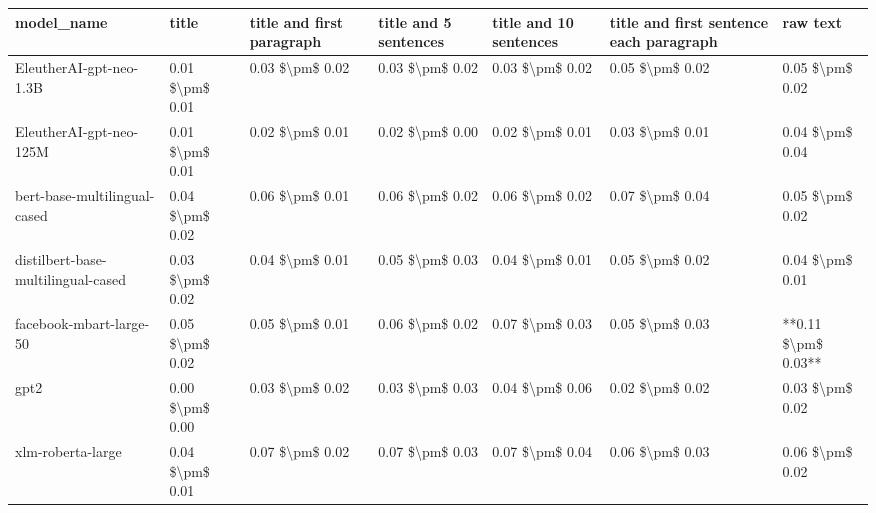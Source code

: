 \begin{tabular}{lllllll}
\toprule
                        model\_name &           title & title and first paragraph & title and 5 sentences & title and 10 sentences & title and first sentence each paragraph &            raw text \\
\midrule
           EleutherAI-gpt-neo-1.3B & 0.01 \$\textbackslash pm\$ 0.01 &           0.03 \$\textbackslash pm\$ 0.02 &       0.03 \$\textbackslash pm\$ 0.02 &        0.03 \$\textbackslash pm\$ 0.02 &                         0.05 \$\textbackslash pm\$ 0.02 &     0.05 \$\textbackslash pm\$ 0.02 \\
           EleutherAI-gpt-neo-125M & 0.01 \$\textbackslash pm\$ 0.01 &           0.02 \$\textbackslash pm\$ 0.01 &       0.02 \$\textbackslash pm\$ 0.00 &        0.02 \$\textbackslash pm\$ 0.01 &                         0.03 \$\textbackslash pm\$ 0.01 &     0.04 \$\textbackslash pm\$ 0.04 \\
      bert-base-multilingual-cased & 0.04 \$\textbackslash pm\$ 0.02 &           0.06 \$\textbackslash pm\$ 0.01 &       0.06 \$\textbackslash pm\$ 0.02 &        0.06 \$\textbackslash pm\$ 0.02 &                         0.07 \$\textbackslash pm\$ 0.04 &     0.05 \$\textbackslash pm\$ 0.02 \\
distilbert-base-multilingual-cased & 0.03 \$\textbackslash pm\$ 0.02 &           0.04 \$\textbackslash pm\$ 0.01 &       0.05 \$\textbackslash pm\$ 0.03 &        0.04 \$\textbackslash pm\$ 0.01 &                         0.05 \$\textbackslash pm\$ 0.02 &     0.04 \$\textbackslash pm\$ 0.01 \\
           facebook-mbart-large-50 & 0.05 \$\textbackslash pm\$ 0.02 &           0.05 \$\textbackslash pm\$ 0.01 &       0.06 \$\textbackslash pm\$ 0.02 &        0.07 \$\textbackslash pm\$ 0.03 &                         0.05 \$\textbackslash pm\$ 0.03 & **0.11 \$\textbackslash pm\$ 0.03** \\
                              gpt2 & 0.00 \$\textbackslash pm\$ 0.00 &           0.03 \$\textbackslash pm\$ 0.02 &       0.03 \$\textbackslash pm\$ 0.03 &        0.04 \$\textbackslash pm\$ 0.06 &                         0.02 \$\textbackslash pm\$ 0.02 &     0.03 \$\textbackslash pm\$ 0.02 \\
                 xlm-roberta-large & 0.04 \$\textbackslash pm\$ 0.01 &           0.07 \$\textbackslash pm\$ 0.02 &       0.07 \$\textbackslash pm\$ 0.03 &        0.07 \$\textbackslash pm\$ 0.04 &                         0.06 \$\textbackslash pm\$ 0.03 &     0.06 \$\textbackslash pm\$ 0.02 \\
\bottomrule
\end{tabular}
